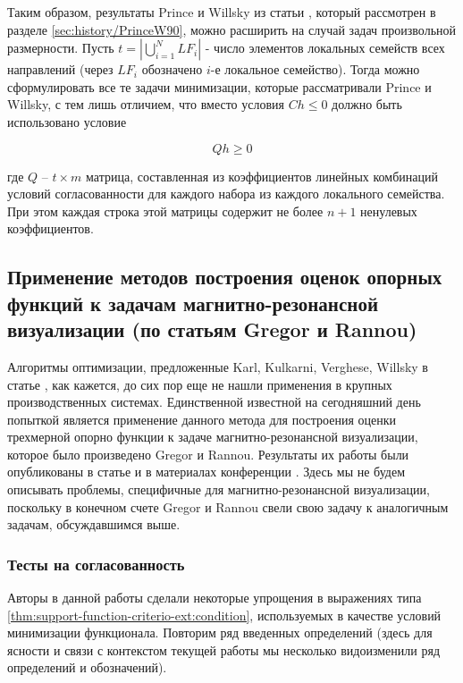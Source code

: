 \documentclass[a4paper, 12pt, titlepage]{article}
\theoremstyle{definition}
\theoremstyle{plain}
\theoremstyle{plain}
\begin{document}
Таким образом, результаты Prince и Willsky из
статьи \cite{journals/pami/PrinceW90}, который рассмотрен в разделе
\ref{sec:history/PrinceW90}, можно расширить на случай задач произвольной
размерности. Пусть $t = |\bigcup \limits_{i = 1}^{N} LF_{i}|$ - число элементов
локальных семейств всех направлений (через $LF_{i}$ обозначено $i$-е локальное 
семейство). Тогда можно сформулировать все те задачи минимизации, которые
рассматривали Prince и Willsky, с тем лишь отличием, что вместо условия
$Ch \leq 0$ должно быть использовано условие

\begin{equation}
 Q h \geq 0
\end{equation}

где $Q$ -- $t \times m$ матрица, составленная из коэффициентов линейных
комбинаций условий согласованности для каждого набора из каждого локального
семейства. При этом каждая строка этой матрицы содержит не более $n + 1$
ненулевых коэффициентов.

\newpage
\subsection{Применение методов построения оценок опорных функций к задачам
магнитно-резонансной визуализации (по статьям Gregor и Rannou)}

Алгоритмы оптимизации, предложенные Karl, Kulkarni, Verghese, Willsky в статье
\cite{journals/jmiv/KarlKVW96}, как кажется, до сих пор еще не нашли применения
в крупных производственных системах. Единственной известной на
сегодняшний день попыткой является применение данного метода для построения
оценки трехмерной опорно функции к задаче магнитно-резонансной визуализации,
которое было произведено Gregor и Rannou. Результаты их работы были
опубликованы в статье \cite{journals/ijist/GregorR2002} и в материалах
конференции \cite{conf/spie/GregorR2001}. Здесь мы не будем описывать
проблемы, специфичные для магнитно-резонансной визуализации, поскольку в
конечном счете Gregor и Rannou свели свою задачу к аналогичным задачам,
обсуждавшимся выше.

\subsubsection{Тесты на согласованность}

Авторы в данной работы сделали некоторые упрощения в выражениях типа
\ref{thm:support-function-criterio-ext:condition}, используемых в качестве
условий минимизации функционала. Повторим ряд введенных определений (здесь для 
ясности и связи с контекстом текущей работы мы несколько видоизменили ряд 
определений и обозначений).
\end{document}
